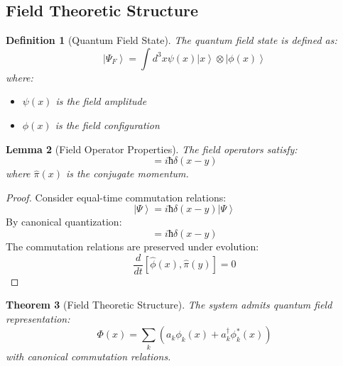 \documentclass[12pt]{article}
\newcommand{\ket}[1]{\left|#1\right\rangle}
\newcommand{\op}[1]{\hat{#1}}
\newtheorem{theorem}{Theorem}[section]
\newtheorem{lemma}[theorem]{Lemma}
\newtheorem{definition}[theorem]{Definition}
\begin{document}
\subsection{Field Theoretic Structure}
\begin{definition}[Quantum Field State]
The quantum field state is defined as:
\begin{equation}
\ket{\Psi_F} = \int d^3x \psi(x)\ket{x} \otimes \ket{\phi(x)}
\end{equation}
where:
\begin{itemize}
\item $\psi(x)$ is the field amplitude
\item $\phi(x)$ is the field configuration
\end{itemize}
\end{definition}
\begin{lemma}[Field Operator Properties]
The field operators satisfy:
\begin{equation}
[\op{\phi}(x),\op{\pi}(y)] = iħ\delta(x-y)
\end{equation}
where $\op{\pi}(x)$ is the conjugate momentum.
\end{lemma}
\begin{proof}
Consider equal-time commutation relations:
\begin{equation}
[\op{\phi}(x,t),\op{\pi}(y,t)]\ket{\Psi} = iħ\delta(x-y)\ket{\Psi}
\end{equation}
By canonical quantization:
\begin{equation}
[\op{\phi}(x),\op{\pi}(y)] = iħ\delta(x-y)
\end{equation}
The commutation relations are preserved under evolution:
\begin{equation}
\frac{d}{dt}[\op{\phi}(x),\op{\pi}(y)] = 0
\end{equation}
\end{proof}
\begin{theorem}[Field Theoretic Structure]
The system admits quantum field representation:
\begin{equation}
\Phi(x) = \sum_k (a_k\phi_k(x) + a_k^\dagger\phi_k^*(x))
\end{equation}
with canonical commutation relations.
\end{theorem}
\end{document}
